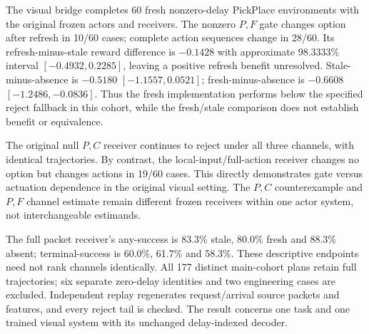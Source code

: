 The visual bridge completes 60 fresh nonzero-delay PickPlace environments with the original frozen actors and receivers. The nonzero $P,F$ gate changes option after refresh in 10/60 cases; complete action sequences change in 28/60. Its refresh-minus-stale reward difference is $-0.1428$ with approximate 98.3333\% interval $[-0.4932,0.2285]$, leaving a positive refresh benefit unresolved. Stale-minus-absence is $-0.5180$ $[-1.1557,0.0521]$; fresh-minus-absence is $-0.6608$ $[-1.2486,-0.0836]$. Thus the fresh implementation performs below the specified reject fallback in this cohort, while the fresh/stale comparison does not establish benefit or equivalence.

The original null $P,C$ receiver continues to reject under all three channels, with identical trajectories. By contrast, the local-input/full-action receiver changes no option but changes actions in 19/60 cases. This directly demonstrates gate versus actuation dependence in the original visual setting. The $P,C$ counterexample and $P,F$ channel estimate remain different frozen receivers within one actor system, not interchangeable estimands.

The full packet receiver's any-success is 83.3\% stale, 80.0\% fresh and 88.3\% absent; terminal-success is 60.0\%, 61.7\% and 58.3\%. These descriptive endpoints need not rank channels identically. All 177 distinct main-cohort plans retain full trajectories; six separate zero-delay identities and two engineering cases are excluded. Independent replay regenerates request/arrival source packets and features, and every reject tail is checked. The result concerns one task and one trained visual system with its unchanged delay-indexed decoder.
